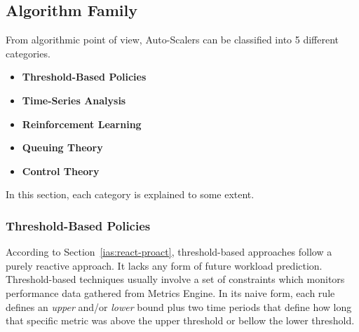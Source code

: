 \subsection{Algorithm Family}
\label{ias:alg-fam}

From algorithmic point of view, Auto-Scalers can be classified into 5 different categories.
\begin{itemize}
    \item \textbf{Threshold-Based Policies}
    \item \textbf{Time-Series Analysis}
    \item \textbf{Reinforcement Learning}
    \item \textbf{Queuing Theory}
    \item \textbf{Control Theory}
\end{itemize}
In this section, each category is explained to some extent.
\subsubsection{Threshold-Based Policies} According to Section~\ref{ias:react-proact}, threshold-based approaches follow a purely  reactive approach. It lacks any form of future workload prediction. Threshold-based techniques usually involve a set of constraints which monitors performance data gathered from Metrics Engine. In its naive form, each rule defines an \emph{upper} and/or \emph{lower} bound plus two time periods that define how long that specific metric was above the upper threshold or bellow the lower threshold.

